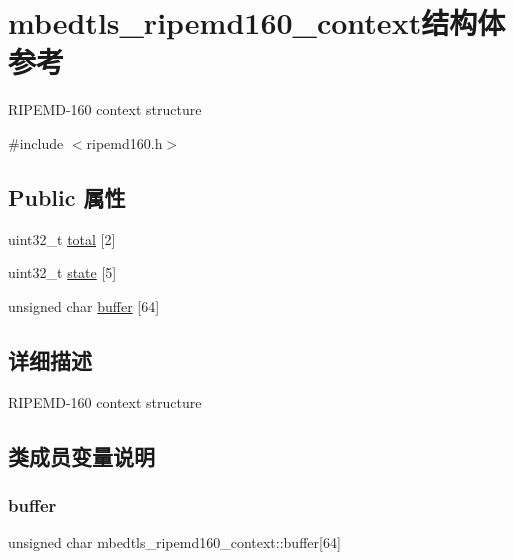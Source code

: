 \hypertarget{structmbedtls__ripemd160__context}{}\section{mbedtls\+\_\+ripemd160\+\_\+context结构体 参考}
\label{structmbedtls__ripemd160__context}


R\+I\+P\+E\+M\+D-\/160 context structure  




{\ttfamily \#include $<$ripemd160.\+h$>$}

\subsection*{Public 属性}
\begin{DoxyCompactItemize}
\item 
uint32\+\_\+t \hyperlink{structmbedtls__ripemd160__context_afc1ec88d27b692be26d819a752be8d4a}{total} \mbox{[}2\mbox{]}
\item 
uint32\+\_\+t \hyperlink{structmbedtls__ripemd160__context_af56cf97ec4c54ae4bb540422b459782c}{state} \mbox{[}5\mbox{]}
\item 
unsigned char \hyperlink{structmbedtls__ripemd160__context_adc89115c7d047411c730324f779fae13}{buffer} \mbox{[}64\mbox{]}
\end{DoxyCompactItemize}


\subsection{详细描述}
R\+I\+P\+E\+M\+D-\/160 context structure 

\subsection{类成员变量说明}
\mbox{\label{structmbedtls__ripemd160__context_adc89115c7d047411c730324f779fae13}} 
\subsubsection{\texorpdfstring{buffer}{buffer}}
{\footnotesize\ttfamily unsigned char mbedtls\+\_\+ripemd160\+\_\+context\+::buffer\mbox{[}64\mbox{]}}


